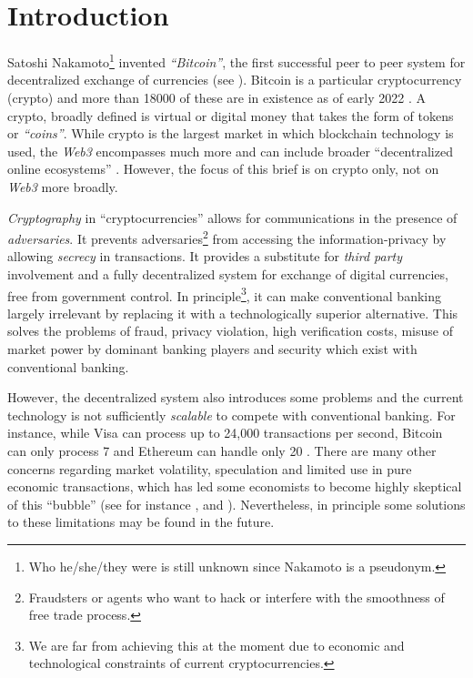 \documentclass[12pt]{article}
\newcommand{\1}{\mathbbm 1}
\begin{document}
	
	\tableofcontents
	
	\newpage{}
		
		
		\section{Introduction}
		
		
		
			Satoshi Nakamoto\footnote{Who he/she/they were is still unknown since Nakamoto is a pseudonym.} invented \textit{``Bitcoin''}, the first successful peer to peer system for decentralized exchange of currencies (see \cite{nakamoto2008bitcoin}). Bitcoin is a particular cryptocurrency (crypto) and more than 18000 of these are in existence as of early 2022 \cite{hayesinvestopedia2022}. A crypto, broadly defined is virtual or digital money that takes the form of tokens or \textit{``coins''}. While crypto is the largest market in which blockchain technology is used, the \textit{Web3} encompasses much more and can include broader ``decentralized online ecosystems'' \cite{korpal2022decentralization}. However, the focus of this brief is on crypto only, not on \textit{Web3} more broadly.
			
			
			\textit{Cryptography} in ``cryptocurrencies'' allows for communications in the presence of \textit{adversaries}. It prevents adversaries\footnote{Fraudsters or agents who want to hack or interfere with the smoothness of free trade process.} from accessing the information-privacy by allowing \textit{secrecy} in transactions. It provides a substitute for \textit{third party} involvement and a fully decentralized system for exchange of digital currencies, free from government control. In principle\footnote{We are far from achieving this at the moment due to economic and technological constraints of current cryptocurrencies.}, it can make conventional banking largely irrelevant by replacing it with a technologically superior alternative. This solves the problems of fraud, privacy violation, high verification costs, misuse of market power by dominant banking players and security which exist with conventional banking.
			
			
			However, the decentralized system also introduces some problems and the current technology is not sufficiently \textit{scalable} to compete with conventional banking. For instance, while Visa can process up to 24,000 transactions per second, Bitcoin can only process 7 and Ethereum can handle only 20 \cite{crypto}. There are many other concerns regarding market volatility, speculation and limited use in pure economic transactions, which has led some economists to become highly skeptical of this ``bubble'' (see for instance \cite{krugman2018transaction}, \cite{roubini2018blockchain} and \cite{cochrane2017bitcoin}). Nevertheless, in principle some solutions to these limitations may be found in the future.
			
\end{document}
